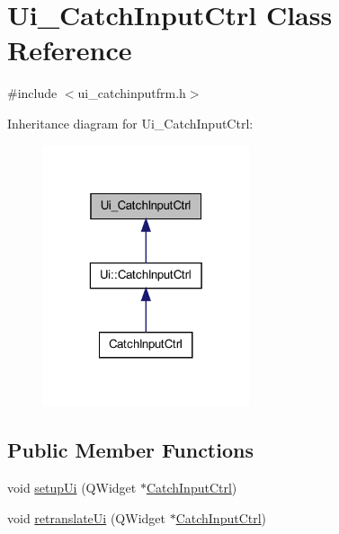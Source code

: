 \hypertarget{class_ui___catch_input_ctrl}{
\section{Ui\_\-CatchInputCtrl Class Reference}
\label{class_ui___catch_input_ctrl}
}


{\ttfamily \#include $<$ui\_\-catchinputfrm.h$>$}



Inheritance diagram for Ui\_\-CatchInputCtrl:\nopagebreak
\begin{figure}[H]
\begin{center}
\leavevmode
\includegraphics[width=172pt]{class_ui___catch_input_ctrl__inherit__graph}
\end{center}
\end{figure}
\subsection*{Public Member Functions}
\begin{DoxyCompactItemize}
\item 
void \hyperlink{class_ui___catch_input_ctrl_aac3148ff222d28ab8911bf1dd9f2a7d5}{setupUi} (QWidget $\ast$\hyperlink{class_catch_input_ctrl}{CatchInputCtrl})
\item 
void \hyperlink{class_ui___catch_input_ctrl_a25736584c7fc37974b9de94ed919df6d}{retranslateUi} (QWidget $\ast$\hyperlink{class_catch_input_ctrl}{CatchInputCtrl})
\end{DoxyCompactItemize}
